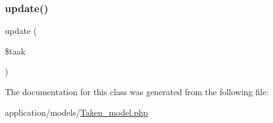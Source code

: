 \mbox{\label{class_taken___model_a2fdc722cb2e60f87bc93a5f2390f88bc}} 
\subsubsection{\texorpdfstring{update()}{update()}}
{\footnotesize\ttfamily update (\begin{DoxyParamCaption}\item[{}]{\$taak }\end{DoxyParamCaption})}



The documentation for this class was generated from the following file\+:\begin{DoxyCompactItemize}
\item 
application/models/\mbox{\hyperlink{_taken__model_8php}{Taken\+\_\+model.\+php}}\end{DoxyCompactItemize}

